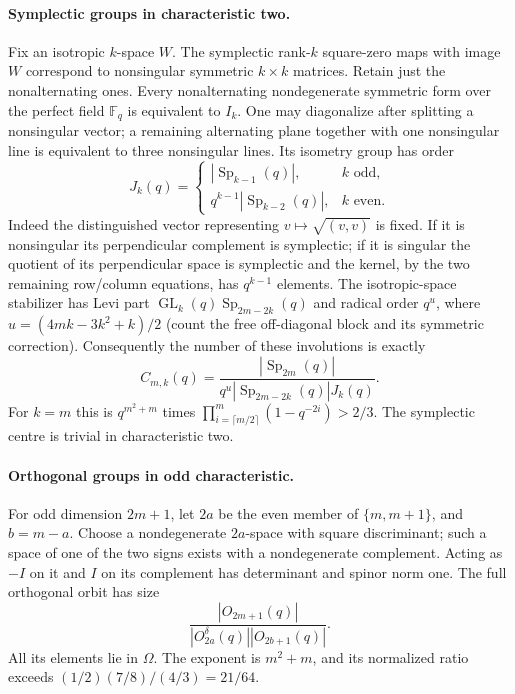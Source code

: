 \documentclass[10pt]{article}
\newcommand{\GL}{\operatorname{GL}}
\newcommand{\Sp}{\operatorname{Sp}}
\newcommand{\Om}{\Omega}
\newcommand{\F}{\mathbb F}
\begin{document}
\paragraph{Symplectic groups in characteristic two.}
Fix an isotropic $k$-space $W$. The symplectic rank-$k$ square-zero maps
with image $W$ correspond to nonsingular symmetric $k\times k$ matrices.
Retain just the nonalternating ones. Every nonalternating nondegenerate
symmetric form over the perfect field $\F_q$ is equivalent to $I_k$.
One may diagonalize after splitting a nonsingular vector; a remaining
alternating plane together with one nonsingular line is equivalent to
three nonsingular lines. Its isometry group has order
\[
J_k(q)=\begin{cases}|\Sp_{k-1}(q)|,&k\text{ odd},\\
q^{k-1}|\Sp_{k-2}(q)|,&k\text{ even}.
\end{cases}
\]
Indeed the distinguished vector representing $v\mapsto\sqrt{(v,v)}$
is fixed. If it is nonsingular its perpendicular complement is symplectic;
if it is singular the quotient of its perpendicular space is symplectic
and the kernel, by the two remaining row/column equations, has $q^{k-1}$
elements. The isotropic-space stabilizer has Levi part
$\GL_k(q)\Sp_{2m-2k}(q)$ and radical order $q^u$, where
$u=(4mk-3k^2+k)/2$ (count the free off-diagonal block and its symmetric
correction). Consequently the number of these involutions is exactly
\begin{equation}\label{spcount}
C_{m,k}(q)=\frac{|\Sp_{2m}(q)|}{q^u|\Sp_{2m-2k}(q)|J_k(q)}.
\end{equation}
For $k=m$ this is $q^{m^2+m}$ times
$\prod_{i=\lceil m/2\rceil}^m(1-q^{-2i})>2/3$. The symplectic centre is
trivial in characteristic two.

\paragraph{Orthogonal groups in odd characteristic.}
For odd dimension $2m+1$, let $2a$ be the even member of $\{m,m+1\}$,
and $b=m-a$. Choose a nondegenerate $2a$-space with square discriminant;
such a space of one of the two signs exists with a nondegenerate
complement. Acting as $-I$ on it and $I$ on its complement has determinant
and spinor norm one. The full orthogonal orbit has size
\[
\frac{|O_{2m+1}(q)|}{|O_{2a}^{\delta}(q)||O_{2b+1}(q)|}.
\]
All its elements lie in $\Om$. The exponent is $m^2+m$, and its normalized
ratio exceeds $(1/2)(7/8)/(4/3)=21/64$.
\end{document}
